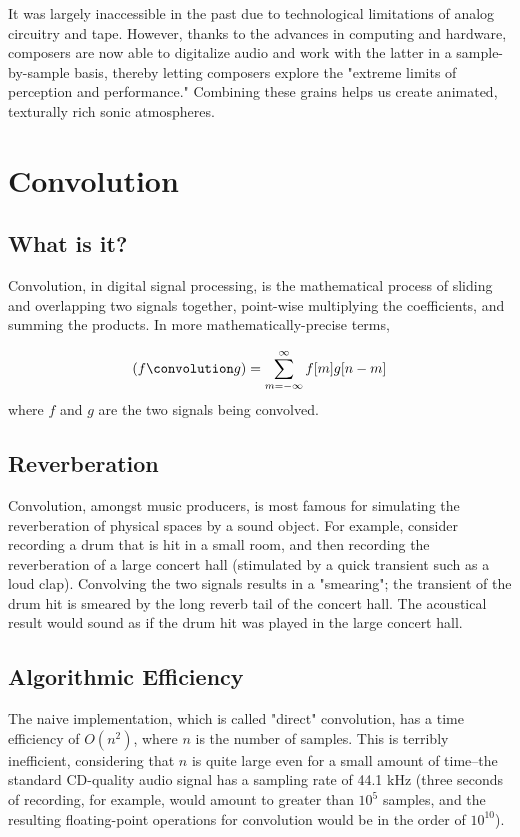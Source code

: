 \documentclass{article}
\begin{document}
			It was largely inaccessible in the past due to technological limitations of analog circuitry and tape. However, thanks to the advances in computing and hardware, composers are now able to digitalize audio and work with the latter in a sample-by-sample basis, thereby letting composers explore the "extreme limits of perception and performance."\cite[Loc. 334]{Curtis_gs}  Combining these grains helps us create animated, texturally rich sonic atmospheres.\cite[Loc. 1024]{Curtis_gs_def}    
			
	\section{Convolution}
		\subsection{What is it?}
			Convolution, in digital signal processing, is the mathematical process of sliding and overlapping two signals together, point-wise multiplying the coefficients, and summing the products. In more mathematically-precise terms, 

		\begin{equation}
			(f \convolution g) = \sum_{m=-\infty}^{\infty} f[m] g[n-m] 
		\end{equation} 
		where $f$ and $g$ are the two signals being convolved.\cite[121]{JOS_conv}  

		\subsection{Reverberation}

			Convolution, amongst music producers, is most famous for simulating the reverberation of physical spaces by a sound object.  For example, consider recording a drum that is hit in a small room, and then recording the reverberation of a large concert hall (stimulated by a quick transient such as a loud clap).  Convolving the two signals results in a "smearing"; the transient of the drum hit is smeared by the long reverb tail of the concert hall. The acoustical result would sound as if the drum hit was played in the large concert hall.

		\subsection{Algorithmic Efficiency}

			The naive implementation, which is called "direct" convolution, has a time efficiency of $O(n^2)$, where $n$ is the number of samples. This is terribly inefficient, considering that $n$ is quite large even for a small amount of time--the standard CD-quality audio signal has a sampling rate of 44.1 kHz (three seconds of recording, for example, would amount to greater than $10^5$ samples, and the resulting floating-point operations for convolution would be in the order of $10^{10}$).  
\end{document}
